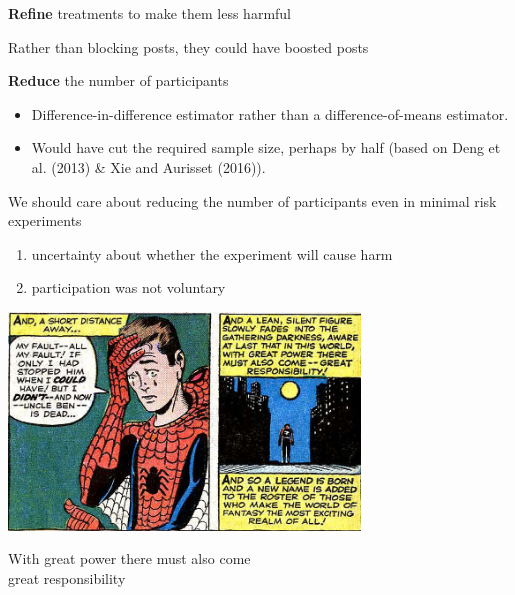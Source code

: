 \documentclass[aspectratio=169]{beamer}
\begin{document}
\begin{frame}

\begin{framed}
\textbf{Refine} treatments to make them less harmful
\end{framed}

\pause
Rather than blocking posts, they could have boosted posts

\end{frame}
\begin{frame}

\begin{framed}
\textbf{Reduce} the number of participants
\end{framed}

\pause
\begin{itemize}
\item Difference-in-difference estimator rather than a difference-of-means estimator.  
\pause
\item Would have cut the required sample size, perhaps by half (based on Deng et al. (2013) \& Xie and Aurisset (2016)).
\end{itemize}

\end{frame}
\begin{frame}

We should care about reducing the number of participants even in minimal risk experiments \pause
\begin{enumerate}
\item uncertainty about whether the experiment will cause harm
\item participation was not voluntary
\end{enumerate}

\end{frame}
\begin{frame}

\begin{center}
\includegraphics[width=0.7\textwidth]{figures/spiderman_great_power}
\end{center}

\pause

\LARGE{
\begin{center}
With great power there must also come\\great responsibility
\end{center}
}

\end{frame}
\end{document}
